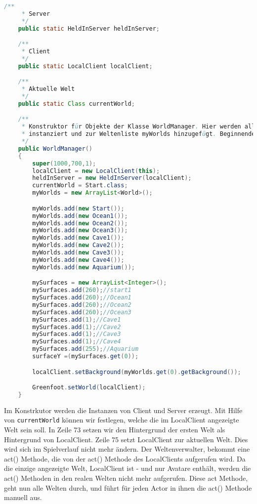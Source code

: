 \documentclass{pi1}
\begin{document}
\begin{lstlisting}[caption={}, firstnumber=24, language=Java]
/**
     * Server
     */
    public static HeldInServer heldInServer;

    /**
     * Client
     */
    public static LocalClient localClient;

    /**
     * Aktuelle Welt
     */
    public static Class currentWorld;

    /**
     * Konstruktor für Objekte der Klasse WorldManager. Hier werden alle gebrauchten Welten
     * instanziert und zur Weltenliste myWorlds hinzugefügt. Beginnende Welt wird gesetzt.
     */
    public WorldManager()
    {    
        super(1000,700,1);
        localClient = new LocalClient(this);
        heldInServer = new HeldInServer(localClient);
        currentWorld = Start.class;
        myWorlds = new ArrayList<World>();

        myWorlds.add(new Start());
        myWorlds.add(new Ocean1());
        myWorlds.add(new Ocean2());
        myWorlds.add(new Ocean3());
        myWorlds.add(new Cave1());
        myWorlds.add(new Cave2());
        myWorlds.add(new Cave3());
        myWorlds.add(new Cave4());
        myWorlds.add(new Aquarium());

        mySurfaces = new ArrayList<Integer>();
        mySurfaces.add(260);//start1
        mySurfaces.add(260);//Ocean1
        mySurfaces.add(260);//Ocean2
        mySurfaces.add(260);//Ocean3
        mySurfaces.add(1);//Cave1
        mySurfaces.add(1);//Cave2
        mySurfaces.add(1);//Cave3
        mySurfaces.add(1);//Cave4
        mySurfaces.add(255);//Aquarium
        surfaceY =(mySurfaces.get(0));

        localClient.setBackground(myWorlds.get(0).getBackground());

        Greenfoot.setWorld(localClient);
    }
\end{lstlisting}
Im Konstrkutor werden die Instanzen von Client und Server erzeugt. Mit Hilfe von \texttt{currentWorld} können wir festlegen, welche die im LocalClient angezeigte Welt sein soll.
In Zeile 73 setzen wir den Hintergrund der ersten Welt als Hintergrund von LocalClient. Zeile 75 setzt LocalClient zur aktuellen Welt. Dies wird sich im Spielverlauf nicht mehr ändern.
Der Weltenverwalter, bekommt eine act() Methode, die von der act() Methode des LocalClients aufgerufen wird. Da die einzige angezeigte Welt, LocalClient ist - und nur Avatare enthält, werden die act() Methoden in den realen Welten nicht mehr aufgerufen. Diese act Methode, geht nun alle Welten durch, und führt für jeden Actor in ihnen die act() Methode manuell aus.
\end{document}
